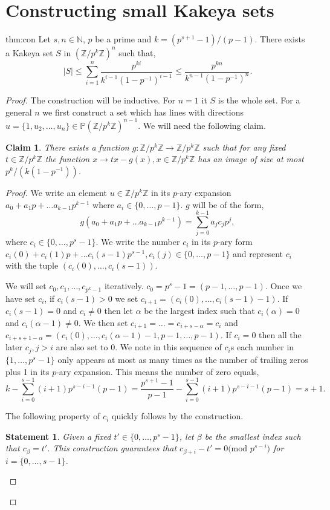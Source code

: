 \documentclass[11pt]{article}
\numberwithin{equation}{section}
\newtheorem{claim}[thm]{Claim}
\newtheorem{stat}[thm]{Statement}
\def\Z{{\mathbb{Z}}}
\def\N{{\mathbb{N}}}
\def\P{{\mathbb{P}}}
\begin{document}
\section{Constructing small Kakeya sets}\label{sec:const}
\begin{repthm}{thm:con}
Let $s,n\in \N$, $p$ be a prime and $k=(p^{s+1}-1)/(p-1)$. There exists a Kakeya set $S$ in $(\Z/p^k\Z)^n$ such that,
$$|S| \le \sum\limits_{i=1}^n \frac{p^{ki}}{k^{i-1}(1-p^{-1})^{i-1}}\le \frac{p^{kn}}{k^{n-1}(1-p^{-1})^{n}}.$$
\end{repthm}
\begin{proof}
The construction will be inductive. For $n=1$ it $S$ is the whole set.
For a general $n$ we first construct a set which has lines with directions $u=\{1,u_2,\hdots,u_n\}\in \P (\Z/p^k\Z)^{n-1}$. We will need the following claim.
\begin{claim}
There exists a function $g: \Z/p^k\Z\rightarrow \Z/p^k\Z$ such that for any fixed $t\in \Z/p^k\Z$ the function $x\rightarrow tx-g(x),x\in \Z/p^k\Z$ has an image of size at most $p^k/(k(1-p^{-1}))$.
\end{claim}
\begin{proof}
We write an element $u\in \Z/p^k\Z$ in its $p$-ary expansion $a_0+a_1p+\hdots a_{k-1}p^{k-1}$ where $a_i\in \{0,\hdots,p-1\}$. $g$ will be of the form,
$$g(a_0+a_1p+\hdots a_{k-1}p^{k-1})=\sum\limits_{j=0}^{k-1} a_jc_jp^j,$$
where $c_i \in \{0,\hdots, p^s-1\}$. We write the number $c_i$ in its $p$-ary form $c_i(0)+c_i(1)p+\hdots c_i(s-1)p^{s-1}, c_i(j)\in \{0,\hdots, p-1\}$ and represent $c_i$ with the tuple $(c_i(0),\hdots,c_i(s-1))$. 

We will set $c_0,c_1,\hdots,c_{p^k-1}$ iteratively. $c_0=p^s-1=(p-1,\hdots,p-1)$. Once we have set $c_i$, if $c_i(s-1)>0$ we set $c_{i+1}=(c_i(0),\hdots,c_i(s-1)-1)$. If $c_i(s-1)=0$ and $c_i\ne 0$ then let $\alpha$ be the largest index such that $c_i(\alpha)=0$ and $c_{i}(\alpha-1)\ne 0$. We then set $c_{i+1}=\hdots=c_{i+s-\alpha}=c_i$ and $c_{i+s+1-\alpha}=(c_i(0),\hdots,c_i(\alpha-1)-1,p-1,\hdots,p-1)$. If $c_i=0$ then all the later $c_j,j>i$ are also set to $0$.  We note in this sequence of $c_i$s each number in $\{1,\hdots, p^s-1\}$ only appears at most as many times as the number of trailing zeros plus 1 in its $p$-ary expansion. This means the number of zero equals,
$$k-\sum\limits_{i=0}^{s-1} (i+1)p^{s-i-1}(p-1)= \frac{p^{s+1}-1}{p-1}-\sum\limits_{i=0}^{s-1} (i+1)p^{s-i-1}(p-1)=s+1.$$

The following property of $c_i$ quickly follows by the construction.
\begin{stat}\label{stat:Ex}
Given a fixed $t'\in \{0,\hdots,p^s-1\}$, let $\beta$ be the smallest index such that $c_\beta=t'$. This construction guarantees that {\em $c_{\beta+i}-t'=0\text{(mod }p^{s-i}\text{)}$} for $i=\{0,\hdots,s-1\}$.


\end{stat}
\end{proof}
\end{proof}
\end{document}

